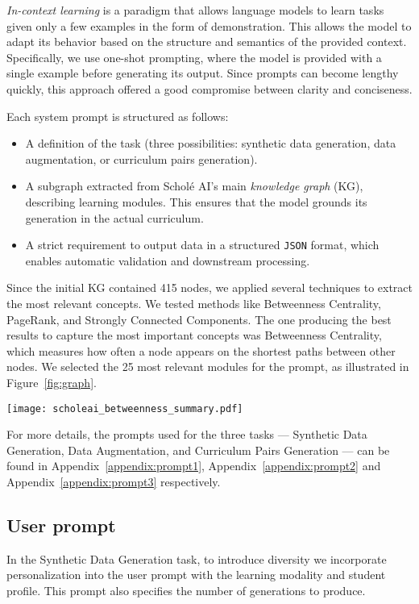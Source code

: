 \textit{In-context learning} is a paradigm that allows language models to learn tasks given only a few examples in the form of demonstration. This allows the model to adapt its behavior based on the structure and semantics of the provided context. Specifically, we use one-shot prompting, where the model is provided with a single example before generating its output. Since prompts can become lengthy quickly, this approach offered a good compromise between clarity and conciseness.

Each system prompt is structured as follows:
\begin{itemize}
	\item A definition of the task (three possibilities: synthetic data generation, data augmentation, or curriculum pairs generation).
    \item A subgraph extracted from Scholé AI's main \textit{knowledge graph} (KG), describing learning modules. This ensures that the model grounds its generation in the actual curriculum.
    \item A strict requirement to output data in a structured \texttt{JSON} format, which enables automatic validation and downstream processing.
\end{itemize}

Since the initial KG contained 415 nodes, we applied several techniques to extract the most relevant concepts. We tested methods like Betweenness Centrality, PageRank, and Strongly Connected Components. The one producing the best results to capture the most important concepts was Betweenness Centrality, which measures how often a node appears on the shortest paths between other nodes. We selected the 25 most relevant modules for the prompt, as illustrated in Figure~\ref{fig:graph}.
\begin{figure*}[h!]
	\texttt{[image: scholeai\_betweenness\_summary.pdf]}
  \caption{ScholéAI Knowledge Graph (Top-25 nodes by Betweenness Centrality).}
  \label{fig:graph}
\end{figure*}

For more details, the prompts used for the three tasks — Synthetic Data Generation, Data Augmentation, and Curriculum Pairs Generation — can be found in Appendix~\ref{appendix:prompt1}, Appendix~\ref{appendix:prompt2} and Appendix~\ref{appendix:prompt3} respectively.

\subsection{User prompt} In the Synthetic Data Generation task, to introduce diversity we incorporate personalization into the user prompt with the learning modality and student profile. This prompt also specifies the number of generations to produce.

